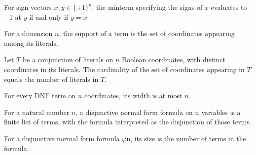 \begin{theorem}
\label{FABL.DNFTerm.eval_minterm_eq_neg_one_iff}
\leanok
{}
For sign vectors $x,y\in\{\pm1\}^n$, the minterm specifying the signs of $x$ evaluates
to $-1$ at $y$ if and only if $y=x$.
\end{theorem}

\begin{definition}
\label{FABL.DNFTerm.support}
\leanok
{}
For a dimension $n$, the support of a term is the set of coordinates appearing among its
literals.
\end{definition}

\begin{theorem}
\label{FABL.DNFTerm.card_support}
\leanok
{}
Let $T$ be a conjunction of literals on $n$ Boolean coordinates, with distinct
coordinates in its literals. The cardinality of the set of coordinates appearing in $T$
equals the number of literals in $T$.
\end{theorem}

\begin{theorem}
\label{FABL.DNFTerm.width_le_dimension}
\leanok
{}
For every DNF term on $n$ coordinates, its width is at most $n$.
\end{theorem}

\begin{definition}
\label{FABL.DNFFormula}
\leanok
{}
For a natural number $n$, a disjunctive normal form formula on $n$ variables is a finite
list of terms, with the formula interpreted as the disjunction of those terms.
\end{definition}

\begin{definition}
\label{FABL.DNFFormula.size}
\leanok
{}
For a disjunctive normal form formula $\varphi$n, its size is the number of terms in the
formula.
\end{definition}

